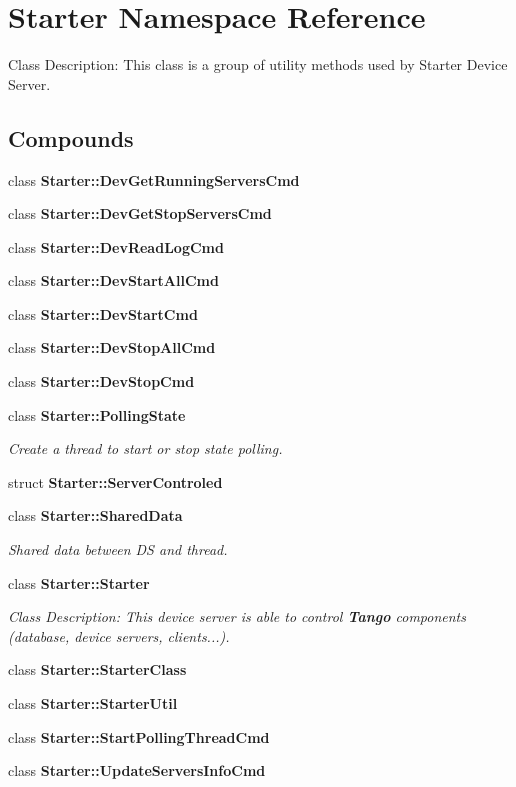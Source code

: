 \section{Starter Namespace Reference}
\label{namespaceStarter}
Class Description: This class is a group of utility methods used by Starter Device Server. 


\subsection*{Compounds}
\begin{CompactItemize}
\item 
class {\bf Starter::Dev\-Get\-Running\-Servers\-Cmd}
\item 
class {\bf Starter::Dev\-Get\-Stop\-Servers\-Cmd}
\item 
class {\bf Starter::Dev\-Read\-Log\-Cmd}
\item 
class {\bf Starter::Dev\-Start\-All\-Cmd}
\item 
class {\bf Starter::Dev\-Start\-Cmd}
\item 
class {\bf Starter::Dev\-Stop\-All\-Cmd}
\item 
class {\bf Starter::Dev\-Stop\-Cmd}
\item 
class {\bf Starter::Polling\-State}
\begin{CompactList}\small\item\em Create a thread to start or stop state polling.\item\end{CompactList}\item 
struct {\bf Starter::Server\-Controled}
\item 
class {\bf Starter::Shared\-Data}
\begin{CompactList}\small\item\em Shared data between DS and thread.\item\end{CompactList}\item 
class {\bf Starter::Starter}
\begin{CompactList}\small\item\em Class Description: This device server is able to control {\bf Tango} components (database, device servers, clients...).\item\end{CompactList}\item 
class {\bf Starter::Starter\-Class}
\item 
class {\bf Starter::Starter\-Util}
\item 
class {\bf Starter::Start\-Polling\-Thread\-Cmd}
\item 
class {\bf Starter::Update\-Servers\-Info\-Cmd}
\end{CompactItemize}
